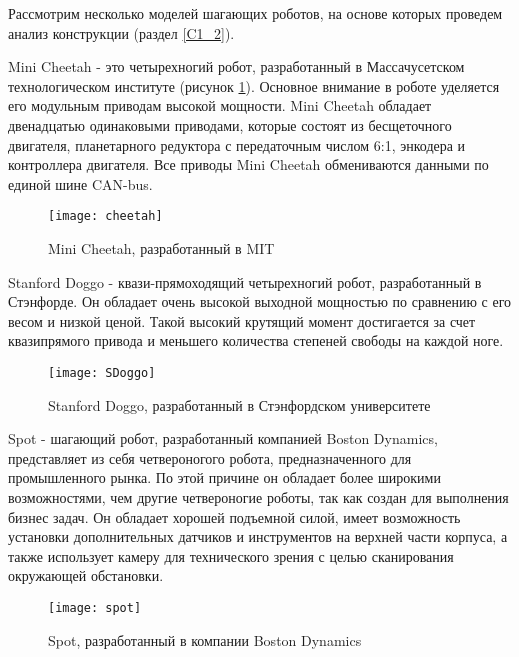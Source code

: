 Рассмотрим несколько моделей шагающих роботов, на основе которых проведем анализ конструкции (раздел \ref{C1_2}).

Mini Cheetah \cite{cheetah} - это четырехногий робот, разработанный в Массачусетском технологическом институте (рисунок \ref{cheetah}). Основное внимание в роботе уделяется его модульным приводам высокой мощности. Mini Cheetah обладает двенадцатью одинаковыми приводами, которые состоят из бесщеточного двигателя, планетарного редуктора с передаточным числом 6:1, энкодера и контроллера двигателя. Все приводы Mini Cheetah обмениваются данными по единой шине CAN-bus.
\begin{figure}[h!]
	\begin{center}
		\texttt{[image: cheetah]}
		\caption{Mini Cheetah, разработанный в MIT}
		\label{cheetah}
	\end{center}
\end{figure}

Stanford Doggo\cite{SDoggo} - квази-прямоходящий четырехногий робот, разработанный в Стэнфорде. Он обладает очень высокой выходной мощностью по сравнению с его весом и низкой ценой. Такой высокий крутящий момент достигается за счет квазипрямого привода и меньшего количества степеней свободы на каждой ноге.
\newpage
\begin{figure}[h!]
	\begin{center}
		\texttt{[image: SDoggo]}
		\caption{Stanford Doggo, разработанный в Стэнфордском университете}
		\label{SDoggo}
	\end{center}
\end{figure}

Spot\cite{spot} - шагающий робот, разработанный компанией Boston Dynamics, представляет из себя четвероногого робота, предназначенного для промышленного рынка. По этой причине он обладает более широкими возможностями, чем другие четвероногие роботы, так как создан для выполнения бизнес задач. Он обладает хорошей подъемной силой, имеет возможность установки дополнительных датчиков и инструментов на верхней части корпуса, а также использует камеру для технического зрения с целью сканирования окружающей обстановки.
\begin{figure}[h!]
	\begin{center}
		\texttt{[image: spot]}
		\caption{Spot, разработанный в компании Boston Dynamics}
		\label{spot}
	\end{center}
\end{figure}


